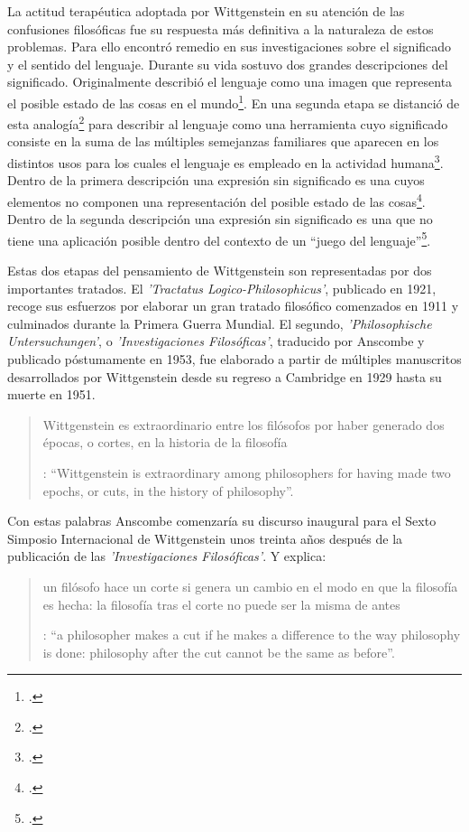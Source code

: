 La actitud terapéutica adoptada por Wittgenstein en su atención de las confusiones filosóficas fue su respuesta más definitiva a la naturaleza de estos problemas. Para ello encontró remedio en sus investigaciones sobre el significado y el sentido del lenguaje.
Durante su vida sostuvo dos grandes descripciones del significado. Originalmente describió el lenguaje como una imagen que representa el posible estado de las cosas en el mundo\footcite[Cf.][\S4.021-4.023]{wittgenstein1922tractatuses}. En una segunda etapa se distanció de esta analogía\footcite[Cf.][\S114-115;120]{wittgenstein1953phiinv} para describir al lenguaje como una herramienta cuyo significado consiste en la suma de las múltiples semejanzas familiares que aparecen en los distintos usos para los cuales el lenguaje es empleado en la actividad humana\footcite[Cf.][\S65-67; 77; 122-133; 569]{wittgenstein1953phiinv}. Dentro de la primera descripción una expresión sin significado es una cuyos elementos no componen una representación del posible estado de las cosas\footcite[Cf.][\S4.03; 4.06; 4.064; 4.112]{wittgenstein1922tractatuses}. Dentro de la segunda descripción una expresión sin significado es una que no tiene una aplicación posible dentro del contexto de un ``juego del lenguaje''\footcite[Cf.][\S80-85; 496-500; 559-568]{wittgenstein1953phiinv}.

Estas dos etapas del pensamiento de Wittgenstein son representadas por dos importantes tratados. El \emph{'Tractatus Logico-Philosophicus'}, publicado en 1921, recoge sus esfuerzos por elaborar un gran tratado filosófico comenzados en 1911 y culminados durante la Primera Guerra Mundial. El segundo, \emph{'Philosophische Untersuchungen'}, o \emph{'Investigaciones Filosóficas'}, traducido por Anscombe y publicado póstumamente en 1953, fue elaborado a partir de múltiples manuscritos desarrollados por Wittgenstein desde su regreso a Cambridge en 1929 hasta su muerte en 1951.

\blockquote[{\Cite[181]{anscombe2011plato:twocuts}}: \enquote{Wittgenstein is extraordinary among philosophers for having made two epochs, or cuts, in the history of philosophy}.]{Wittgenstein es extraordinario entre los filósofos por haber generado dos épocas, o cortes, en la historia de la filosofía}. Con estas palabras Anscombe comenzaría su discurso inaugural para el Sexto Simposio Internacional de Wittgenstein unos treinta años después de la publicación de las \emph{'Investigaciones Filosóficas'}. Y explica: \blockquote[{\Cite[181]{anscombe2011plato:twocuts}}: \enquote{a philosopher makes a cut if he makes a difference to the way philosophy is done: philosophy after the cut cannot be the same as before}.]{un filósofo hace un corte si genera un cambio en el modo en que la filosofía es hecha: la filosofía tras el corte no puede ser la misma de antes}.


